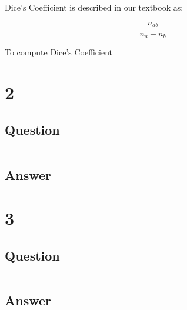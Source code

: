 \documentclass[letterpaper,11pt]{article}
\begin{document}
Dice's Coefficient is described in our textbook \cite{book} as:

\[
    \frac{n_{ab}}{n_a+n_b}
\]

To compute Dice's Coefficient 



\clearpage


\section*{2}

\subsection*{Question}

\begin{verbatim}

\end{verbatim}

\subsection*{Answer}



\clearpage


\section*{3}

\subsection*{Question}

\begin{verbatim}

\end{verbatim}

\subsection*{Answer}
\end{document}
